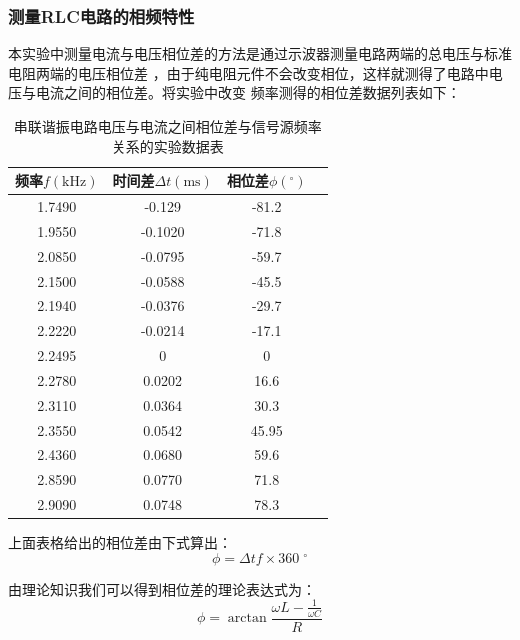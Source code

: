 \documentclass[a4paper]{ctexart}
\begin{document}
    \subsubsection{测量RLC电路的相频特性}
    \par 
    本实验中测量电流与电压相位差的方法是通过示波器测量电路两端的总电压与标准电阻两端的电压相位差
    ，由于纯电阻元件不会改变相位，这样就测得了电路中电压与电流之间的相位差。将实验中改变
    频率测得的相位差数据列表如下：
    \begin{table}[htbp]
        \centering
        \caption{串联谐振电路电压与电流之间相位差与信号源频率关系的实验数据表}
        \begin{tabular}{cccc}
            \toprule[1.5pt]
            频率$f(\mathrm{kHz})$ & 时间差$\Delta t(\mathrm{ms})$ & 相位差$\phi(^{\circ})$\\
            \midrule
            1.7490 & -0.129 & -81.2 \\
            1.9550 & -0.1020 & -71.8 \\
            2.0850 & -0.0795 & -59.7 \\
            2.1500 & -0.0588 & -45.5 \\
            2.1940 & -0.0376 & -29.7 \\
            2.2220 & -0.0214 & -17.1 \\
            2.2495 & 0       & 0     \\
            2.2780 & 0.0202 & 16.6\\
            2.3110 & 0.0364 & 30.3\\
            2.3550 & 0.0542 & 45.95\\
            2.4360 & 0.0680 & 59.6\\
            2.8590 & 0.0770 & 71.8\\
            2.9090 & 0.0748 & 78.3\\
            \bottomrule[1.5pt]
        \end{tabular}
    \end{table}
    \par 
    上面表格给出的相位差由下式算出：
    $$
    \phi = \Delta t f \times 360\;^{\circ}
    $$
    \par 
    由理论知识我们可以得到相位差的理论表达式为：
    $$
    \phi = \arctan\frac{\omega L - \frac{1}{\omega C}}{R}
    $$
\end{document}
